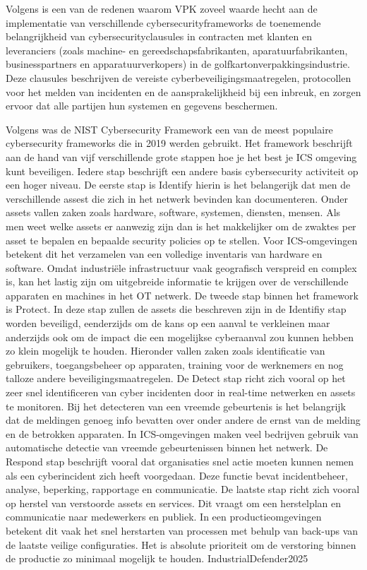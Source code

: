 Volgens \textcite{fefco2025} is een van de redenen waarom VPK zoveel waarde hecht aan de implementatie van verschillende cybersecurityframeworks de toenemende belangrijkheid van cybersecurityclausules in contracten met klanten en leveranciers (zoals machine- en gereedschapsfabrikanten, aparatuurfabrikanten, businesspartners en apparatuurverkopers) in de golfkartonverpakkingsindustrie. Deze clausules beschrijven de vereiste cyberbeveiligingsmaatregelen, protocollen voor het melden van incidenten en de aansprakelijkheid bij een inbreuk, en zorgen ervoor dat alle partijen hun systemen en gegevens beschermen.

Volgens \textcite{IndustrialDefender2025} was de NIST Cybersecurity Framework een van de meest populaire cybersecurity frameworks die in 2019 werden gebruikt. Het framework beschrijft aan de hand van vijf verschillende grote stappen hoe je het best je ICS omgeving kunt beveiligen. Iedere stap beschrijft een andere basis cybersecurity activiteit op een hoger niveau.
De eerste stap is Identify hierin is het belangerijk dat men de verschillende assest die zich in het netwerk bevinden kan documenteren. Onder assets vallen zaken zoals hardware, software, systemen, diensten, mensen. Als men weet welke assets er aanwezig zijn dan is het makkelijker om de zwaktes per asset te bepalen en bepaalde security policies op te stellen. Voor ICS-omgevingen betekent dit het verzamelen van een volledige inventaris van hardware en software. Omdat industriële infrastructuur vaak geografisch verspreid en complex is, kan het lastig zijn om uitgebreide informatie te krijgen over de verschillende apparaten en machines in het OT netwerk. \autocite{Nist2024}
De tweede stap binnen het framework is Protect. In deze stap zullen de assets die beschreven zijn in de Identifiy stap worden beveiligd, eenderzijds om de kans op een aanval te verkleinen maar anderzijds ook om de impact die een mogelijkse cyberaanval zou kunnen hebben zo klein mogelijk te houden. Hieronder vallen zaken zoals identificatie van gebruikers, toegangsbeheer op apparaten, training voor de werknemers en nog talloze andere beveiligingsmaatregelen. \autocite{Nist2024}
De Detect stap richt zich vooral op het zeer snel identificeren van cyber incidenten door in real-time netwerken en assets te monitoren. Bij het detecteren van een vreemde gebeurtenis is het belangrijk dat de meldingen genoeg info bevatten over onder andere de ernst van de melding en de betrokken apparaten. In ICS-omgevingen maken veel bedrijven gebruik van automatische detectie van vreemde gebeurtenissen binnen het netwerk. \autocite{Nist2024}
De Respond stap beschrijft vooral dat organisaties snel actie moeten kunnen nemen als een cyberincident zich heeft voorgedaan. Deze functie bevat incidentbeheer, analyse, beperking, rapportage en communicatie. \autocite{Nist2024}
De laatste stap richt zich vooral op herstel van verstoorde assets en services. Dit vraagt om een herstelplan en communicatie naar medewerkers en publiek. In een productieomgevingen betekent dit vaak het snel herstarten van processen met behulp van back-ups van de laatste veilige configuraties. Het is absolute prioriteit om de verstoring binnen de productie zo minimaal mogelijk te houden. {IndustrialDefender2025}


